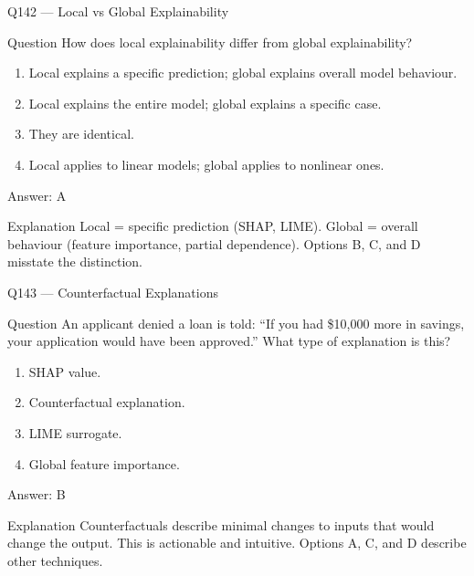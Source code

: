 \documentclass[aspectratio=169,8pt]{beamer}
\begin{document}
\begin{frame}{Q142 --- Local vs Global Explainability}
\begin{block}{Question}
How does local explainability differ from global explainability?
\begin{enumerate}
\item Local explains a specific prediction; global explains overall model behaviour.
\item Local explains the entire model; global explains a specific case.
\item They are identical.
\item Local applies to linear models; global applies to nonlinear ones.
\end{enumerate} 	\end{block}
\begin{exampleblock}{Answer: A}\end{exampleblock}
\begin{block}{Explanation}
Local = specific prediction (SHAP, LIME). Global = overall behaviour (feature importance, partial dependence). Options B, C, and D misstate the distinction.
\end{block}
\end{frame}

\begin{frame}{Q143 --- Counterfactual Explanations}
\begin{block}{Question}
An applicant denied a loan is told: ``If you had \$10,000 more in savings, your application would have been approved.'' What type of explanation is this?
\begin{enumerate}
\item SHAP value.
\item Counterfactual explanation.
\item LIME surrogate.
\item Global feature importance.
\end{enumerate} 	\end{block}
\begin{exampleblock}{Answer: B}\end{exampleblock}
\begin{block}{Explanation}
Counterfactuals describe minimal changes to inputs that would change the output. This is actionable and intuitive. Options A, C, and D describe other techniques.
\end{block}
\end{frame}
\end{document}

